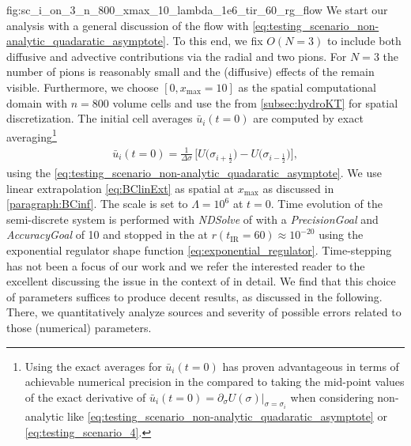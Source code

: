 	{fig:sc_i_on_3_n_800_xmax_10_lambda_1e6_tir_60_rg_flow}%
We start our analysis with a general discussion of the \frg{} flow with \ic{} \eqref{eq:testing_scenario_non-analytic_quadaratic_asymptote}.
To this end, we fix $O(N = 3)$ to include both diffusive and advective contributions via the radial \sigmaMode{} and two pions. For $N = 3$ the number of pions is reasonably small and the (diffusive) effects of the \sigmaMode{} remain visible.
Furthermore, we choose $[ 0, x_\mathrm{max} = 10 ]$ as the spatial computational domain with $n=800$ volume cells and use the \ktScheme{} from \cref{subsec:hydroKT} for spatial discretization.
The initial cell averages $\bar{u}_i ( t = 0 )$ are computed by exact averaging\footnote{%
	Using the exact averages for $\bar{u}_i(t=0)$ has proven advantageous in terms of achievable numerical precision in the \ir{} compared to taking the mid-point values of the exact derivative of ${ \bar{u}_i ( t = 0 ) = \partial_\sigma U ( \sigma ) |_{\sigma = \sigma_i} }$ when considering non-analytic \ics{} like \cref{eq:testing_scenario_non-analytic_quadaratic_asymptote} or \eqref{eq:testing_scenario_4}.%
} 
\begin{align}
	\bar{u}_i ( t = 0 ) = \frac{1}{\Delta \sigma} \, \big[ U \big( \sigma_{i + \frac{1}{2}} \big) - U \big( \sigma_{i - \frac{1}{2}} \big) \big] ,
\end{align}
using the \uv{} \ic{} \eqref{eq:testing_scenario_non-analytic_quadaratic_asymptote}.
We use linear extrapolation \eqref{eq:BClinExt} as spatial \bc{} at $x_\mathrm{max}$ as discussed in \cref{paragraph:BCinf}.
The \uv{} scale is set to $\Lambda = 10^6$ at $t = 0$. 
Time evolution of the semi-discrete \kt{} \ode{} system is performed with \textit{NDSolve} of \WAMXIIwR{} with a \textit{PrecisionGoal} and \textit{AccuracyGoal} of 10 and stopped in the \ir{} at $r ( t_\mathrm{IR} = 60 ) \approx 10^{-20}$ using the exponential regulator shape function \eqref{eq:exponential_regulator}.
Time-stepping has not been a focus of our work and we refer the interested reader to the excellent  discussing the issue in the context of \frg{} in detail.
We find that this choice of parameters suffices to produce decent results, as discussed in the following.
There, we quantitatively analyze sources and severity of possible errors related to those (numerical) parameters.


